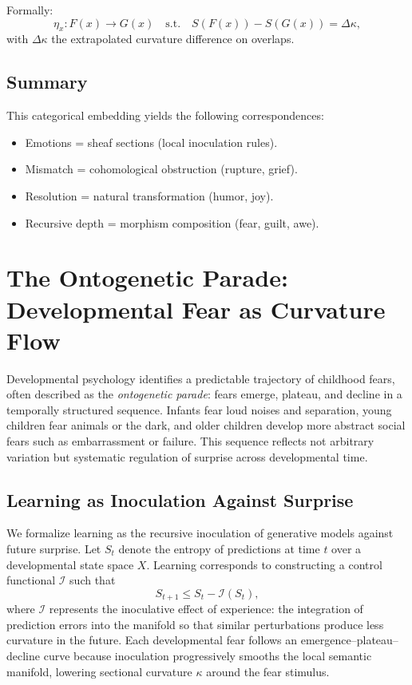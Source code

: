 \documentclass{article}
\theoremstyle{definition}
\begin{document}
Formally:
\[
\eta_x : F(x) \to G(x) \quad \text{s.t.} \quad 
S(F(x)) - S(G(x)) = \Delta \kappa,
\]
with $\Delta \kappa$ the extrapolated curvature difference on overlaps.

\subsection*{Summary}

This categorical embedding yields the following correspondences:

\begin{itemize}
  \item Emotions = sheaf sections (local inoculation rules).
  \item Mismatch = cohomological obstruction (rupture, grief).
  \item Resolution = natural transformation (humor, joy).
  \item Recursive depth = morphism composition (fear, guilt, awe).
\end{itemize}

\section{The Ontogenetic Parade: Developmental Fear as Curvature Flow}

Developmental psychology identifies a predictable trajectory of childhood fears,
often described as the \emph{ontogenetic parade}: fears emerge, plateau, and
decline in a temporally structured sequence. Infants fear loud noises and
separation, young children fear animals or the dark, and older children develop
more abstract social fears such as embarrassment or failure. This sequence
reflects not arbitrary variation but systematic regulation of surprise across
developmental time.

\subsection{Learning as Inoculation Against Surprise}

We formalize learning as the recursive inoculation of generative models against
future surprise. Let $S_t$ denote the entropy of predictions at time $t$ over a
developmental state space $X$. Learning corresponds to constructing a control
functional $\mathcal{I}$ such that
\[
S_{t+1} \leq S_t - \mathcal{I}(S_t),
\]
where $\mathcal{I}$ represents the inoculative effect of experience: the
integration of prediction errors into the manifold so that similar perturbations
produce less curvature in the future. Each developmental fear follows an
emergence--plateau--decline curve because inoculation progressively smooths the
local semantic manifold, lowering sectional curvature $\kappa$ around the fear
stimulus.
\end{document}
